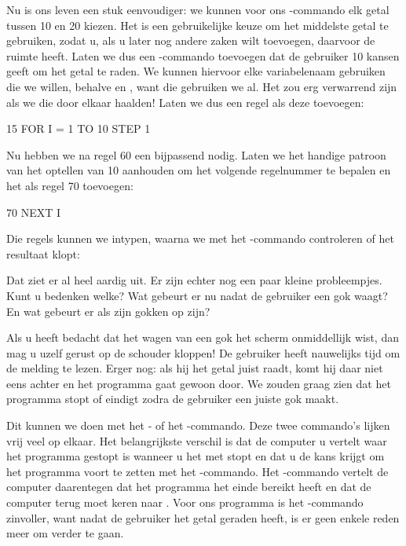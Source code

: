 
\needspace{3cm}
Nu is ons leven een stuk eenvoudiger: we kunnen voor ons -commando elk getal tussen 10 en 20 kiezen. Het is een gebruikelijke keuze om het middelste getal te gebruiken, zodat u, als u later nog andere zaken wilt toevoegen, daarvoor de ruimte heeft. Laten we dus een -commando toevoegen dat de gebruiker 10 kansen geeft om het getal te raden. We kunnen hiervoor elke variabelenaam gebruiken die we willen, behalve  en , want die gebruiken we al. Het zou erg verwarrend zijn als we die door elkaar haalden! Laten we dus een regel als deze toevoegen:

\begin{screencode}
15 FOR I = 1 TO 10 STEP 1
\end{screencode}

\needspace{3cm}
Nu hebben we na regel 60 een bijpassend  nodig. Laten we het handige patroon van het optellen van 10 aanhouden om het volgende regelnummer te bepalen en het als regel 70 toevoegen:

\begin{screencode}
70 NEXT I
\end{screencode}

\needspace{4cm}
Die regels kunnen we intypen, waarna we met het -commando controleren of het resultaat klopt:


Dat ziet er al heel aardig uit. Er zijn echter nog een paar kleine probleempjes. Kunt u bedenken welke? Wat gebeurt er nu nadat de gebruiker een gok waagt? En wat gebeurt er als zijn gokken op zijn?

Als u heeft bedacht dat het wagen van een gok het scherm onmiddellijk wist, dan mag u uzelf gerust op de schouder kloppen! De gebruiker heeft nauwelijks tijd om de melding te lezen. Erger nog: als hij het getal juist raadt, komt hij daar niet eens achter en het programma gaat gewoon door. We zouden graag zien dat het programma stopt of eindigt zodra de gebruiker een juiste gok maakt.

Dit kunnen we doen met het - of het -commando. Deze twee commando's lijken vrij veel op elkaar. Het belangrijkste verschil is dat de computer u vertelt waar het programma gestopt is wanneer u het met  stopt en dat u de kans krijgt om het programma voort te zetten met het -commando. Het -commando vertelt de computer daarentegen dat het programma het einde bereikt heeft en dat de computer terug moet keren naar . Voor ons programma is het -commando zinvoller, want nadat de gebruiker het getal geraden heeft, is er geen enkele reden meer om verder te gaan.

